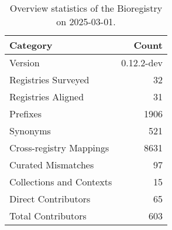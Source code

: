 \begin{table}
\caption{Overview statistics of the Bioregistry on 2025-03-01.}
\label{tab:bioregistry-summary}
\begin{tabular}{lr}
\toprule
Category & Count \\
\midrule
Version & 0.12.2-dev \\
Registries Surveyed & 32 \\
Registries Aligned & 31 \\
Prefixes & 1906 \\
Synonyms & 521 \\
Cross-registry Mappings & 8631 \\
Curated Mismatches & 97 \\
Collections and Contexts & 15 \\
Direct Contributors & 65 \\
Total Contributors & 603 \\
\bottomrule
\end{tabular}
\end{table}
